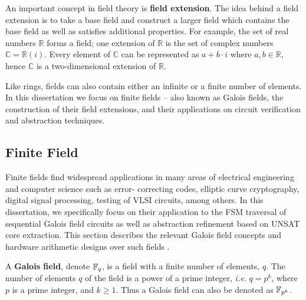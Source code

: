 An important concept in field theory is {\bf field extension}. The idea behind a
field extension is to take a base field and construct a larger field which 
contains the base field as well as satisfies additional properties. For example,
the set of real numbers $\mathbb{R}$ forms a field; one extension of 
$\mathbb{R}$ is the set of complex numbers $\mathbb{C}=\mathbb{R}(i)$. Every
element of $\mathbb{C}$ can be represented as $a+b\cdot i$ where $a,b \in \mathbb{R}$,
hence $\mathbb{C}$ is a two-dimensional extension of $\mathbb{R}$.

Like rings, fields can also contain either an infinite or a finite number of 
elements. 
In this dissertation we focus on finite fields -- also known as Galois fields, 
the construction of their field extensions, and their applications on circuit verification and abstraction techniques.

\subsection{Finite Field}
Finite fields find widespread applications in 
many areas of electrical engineering and computer science such as error-
correcting codes, elliptic curve cryptography, digital signal processing, 
testing of VLSI circuits, among others.
In this dissertation, we specifically focus on their application to 
the FSM traversal of sequential Galois field circuits as well as abstraction refinement based on UNSAT core extraction.
This section describes the relevant Galois field concepts
\cite{galois_field:mceliece} \cite{ftheory:2006} \cite{ff:1997}
and hardware arithmetic designs over such fields \cite{mastro:1989} \cite{PT:1985} 
\cite{acar:1998} \cite{wu:2002} \cite{Knezevic:2008}. 


\begin{Definition} 
A {\bf Galois field}, denote ${\mathbb{F}}_{q}$, is a field with a finite
number of elements, $q$. The number of elements $q$ of the field is
a power of a prime integer, {\it i.e.} $q = p^k$, where $p$ is a prime
integer, and $k \geq 1$. Thus a Galois field can also be denoted as 
${\mathbb{F}}_{p^{k}}$.
\end{Definition}

